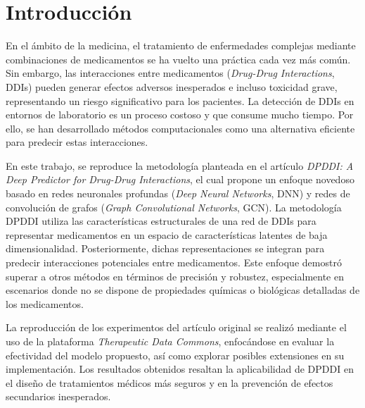 \chapter*{Introducción}

En el ámbito de la medicina, el tratamiento de enfermedades complejas mediante combinaciones de medicamentos se ha vuelto una práctica cada vez más común. Sin embargo, las interacciones entre medicamentos (\textit{Drug-Drug Interactions}, DDIs) pueden generar efectos adversos inesperados e incluso toxicidad grave, representando un riesgo significativo para los pacientes. La detección de DDIs en entornos de laboratorio es un proceso costoso y que consume mucho tiempo. Por ello, se han desarrollado métodos computacionales como una alternativa eficiente para predecir estas interacciones.

En este trabajo, se reproduce la metodología planteada en el artículo \textit{DPDDI: A Deep Predictor for Drug-Drug Interactions}, el cual propone un enfoque novedoso basado en redes neuronales profundas (\textit{Deep Neural Networks}, DNN) y redes de convolución de grafos (\textit{Graph Convolutional Networks}, GCN). La metodología DPDDI utiliza las características estructurales de una red de DDIs para representar medicamentos en un espacio de características latentes de baja dimensionalidad. Posteriormente, dichas representaciones se integran para predecir interacciones potenciales entre medicamentos. Este enfoque demostró superar a otros métodos en términos de precisión y robustez, especialmente en escenarios donde no se dispone de propiedades químicas o biológicas detalladas de los medicamentos.

La reproducción de los experimentos del artículo original se realizó mediante el uso de la plataforma \textit{Therapeutic Data Commons}, enfocándose en evaluar la efectividad del modelo propuesto, así como explorar posibles extensiones en su implementación. Los resultados obtenidos resaltan la aplicabilidad de DPDDI en el diseño de tratamientos médicos más seguros y en la prevención de efectos secundarios inesperados. 